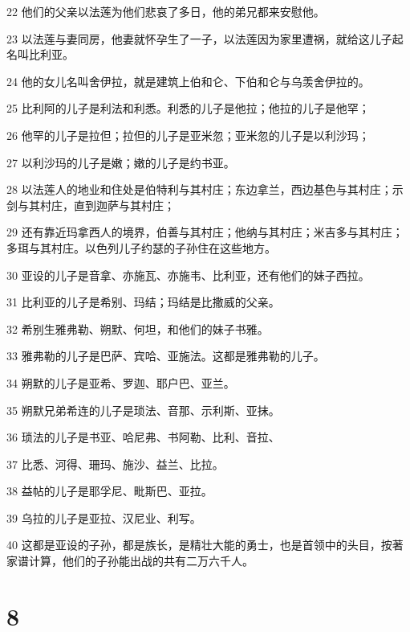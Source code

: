 \par 22 他们的父亲以法莲为他们悲哀了多日，他的弟兄都来安慰他。
\par 23 以法莲与妻同房，他妻就怀孕生了一子，以法莲因为家里遭祸，就给这儿子起名叫比利亚。
\par 24 他的女儿名叫舍伊拉，就是建筑上伯和仑、下伯和仑与乌羡舍伊拉的。
\par 25 比利阿的儿子是利法和利悉。利悉的儿子是他拉；他拉的儿子是他罕；
\par 26 他罕的儿子是拉但；拉但的儿子是亚米忽；亚米忽的儿子是以利沙玛；
\par 27 以利沙玛的儿子是嫩；嫩的儿子是约书亚。
\par 28 以法莲人的地业和住处是伯特利与其村庄；东边拿兰，西边基色与其村庄；示剑与其村庄，直到迦萨与其村庄；
\par 29 还有靠近玛拿西人的境界，伯善与其村庄；他纳与其村庄；米吉多与其村庄；多珥与其村庄。以色列儿子约瑟的子孙住在这些地方。
\par 30 亚设的儿子是音拿、亦施瓦、亦施韦、比利亚，还有他们的妹子西拉。
\par 31 比利亚的儿子是希别、玛结；玛结是比撒威的父亲。
\par 32 希别生雅弗勒、朔默、何坦，和他们的妹子书雅。
\par 33 雅弗勒的儿子是巴萨、宾哈、亚施法。这都是雅弗勒的儿子。
\par 34 朔默的儿子是亚希、罗迦、耶户巴、亚兰。
\par 35 朔默兄弟希连的儿子是琐法、音那、示利斯、亚抹。
\par 36 琐法的儿子是书亚、哈尼弗、书阿勒、比利、音拉、
\par 37 比悉、河得、珊玛、施沙、益兰、比拉。
\par 38 益帖的儿子是耶孚尼、毗斯巴、亚拉。
\par 39 乌拉的儿子是亚拉、汉尼业、利写。
\par 40 这都是亚设的子孙，都是族长，是精壮大能的勇士，也是首领中的头目，按著家谱计算，他们的子孙能出战的共有二万六千人。

\chapter{8}

